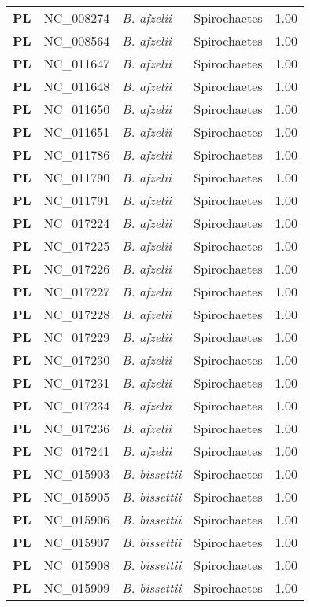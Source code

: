 \begin{adjustwidth}{-3cm}{2cm}
{\begin{supertabular}{>{\bfseries}l|p{0.1\textwidth}p{0.14\textwidth}l|l}
PL & NC\_008274 & \textit{B. afzelii} & Spirochaetes & 1.00\\
PL & NC\_008564 & \textit{B. afzelii} & Spirochaetes & 1.00\\
PL & NC\_011647 & \textit{B. afzelii} & Spirochaetes & 1.00\\
PL & NC\_011648 & \textit{B. afzelii} & Spirochaetes & 1.00\\
PL & NC\_011650 & \textit{B. afzelii} & Spirochaetes & 1.00\\
PL & NC\_011651 & \textit{B. afzelii} & Spirochaetes & 1.00\\
PL & NC\_011786 & \textit{B. afzelii} & Spirochaetes & 1.00\\
PL & NC\_011790 & \textit{B. afzelii} & Spirochaetes & 1.00\\
PL & NC\_011791 & \textit{B. afzelii} & Spirochaetes & 1.00\\
PL & NC\_017224 & \textit{B. afzelii} & Spirochaetes & 1.00\\
PL & NC\_017225 & \textit{B. afzelii} & Spirochaetes & 1.00\\
PL & NC\_017226 & \textit{B. afzelii} & Spirochaetes & 1.00\\
PL & NC\_017227 & \textit{B. afzelii} & Spirochaetes & 1.00\\
PL & NC\_017228 & \textit{B. afzelii} & Spirochaetes & 1.00\\
PL & NC\_017229 & \textit{B. afzelii} & Spirochaetes & 1.00\\
PL & NC\_017230 & \textit{B. afzelii} & Spirochaetes & 1.00\\
PL & NC\_017231 & \textit{B. afzelii} & Spirochaetes & 1.00\\
PL & NC\_017234 & \textit{B. afzelii} & Spirochaetes & 1.00\\
PL & NC\_017236 & \textit{B. afzelii} & Spirochaetes & 1.00\\
PL & NC\_017241 & \textit{B. afzelii} & Spirochaetes & 1.00\\
PL & NC\_015903 & \textit{B. bissettii} & Spirochaetes & 1.00\\
PL & NC\_015905 & \textit{B. bissettii} & Spirochaetes & 1.00\\
PL & NC\_015906 & \textit{B. bissettii} & Spirochaetes & 1.00\\
PL & NC\_015907 & \textit{B. bissettii} & Spirochaetes & 1.00\\
PL & NC\_015908 & \textit{B. bissettii} & Spirochaetes & 1.00\\
PL & NC\_015909 & \textit{B. bissettii} & Spirochaetes & 1.00\\

\end{supertabular}}
\end{adjustwidth}
